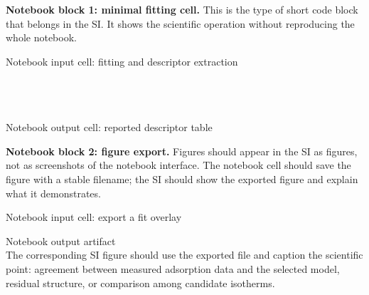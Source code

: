 \documentclass[journal=jacsat,manuscript=article]{achemso}
\begin{document}
\noindent\textbf{Notebook block 1: minimal fitting cell.}
This is the type of short code block that belongs in the SI. It shows the
scientific operation without reproducing the whole notebook.

\begin{bluebox}{Notebook input cell: fitting and descriptor extraction}
\small
\noindent\texttt{}\\
\texttt{}\\
\texttt{}\\
\texttt{}\\
\texttt{}
\end{bluebox}

\begin{greenbox}{Notebook output cell: reported descriptor table}
\small
\noindent\texttt{}\\
\texttt{}
\end{greenbox}

\noindent\textbf{Notebook block 2: figure export.}
Figures should appear in the SI as figures, not as screenshots of the notebook
interface. The notebook cell should save the figure with a stable filename; the
SI should show the exported figure and explain what it demonstrates.

\begin{bluebox}{Notebook input cell: export a fit overlay}
\small
\noindent\texttt{}\\
\texttt{}
\end{bluebox}

\begin{greenbox}{Notebook output artifact}
\small
\noindent\texttt{}\\
The corresponding SI figure should use the exported file and caption the
scientific point: agreement between measured adsorption data and the selected
model, residual structure, or comparison among candidate isotherms.
\end{greenbox}
\end{document}
